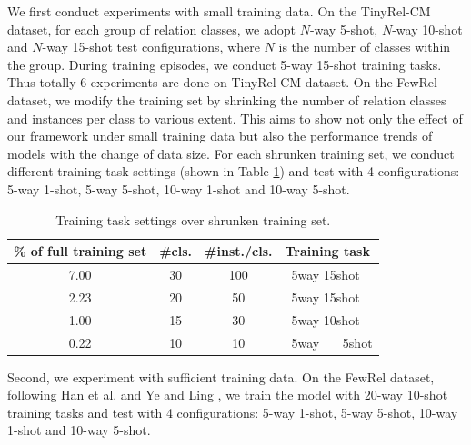 We first conduct experiments with small training data.
On the TinyRel-CM dataset, for each group of relation classes, we adopt $N$-way 5-shot, $N$-way 10-shot and $N$-way 15-shot test configurations, where $N$ is the number of classes within the group. During training episodes, we conduct 5-way 15-shot training tasks. Thus totally 6 experiments are done on TinyRel-CM dataset.
On the FewRel dataset, we modify the training set by shrinking the number of relation classes and instances per class to various extent. This aims to show not only the effect of our framework under small training data but also the performance trends of models with the change of data size.
For each shrunken training set, we conduct different training task settings
(shown in Table \ref{trainingsetting}) and test with 4 configurations:
5-way 1-shot, 5-way 5-shot, 10-way 1-shot and 10-way 5-shot. %

\begin{table}[ht]
\centering
\small
\caption{Training task settings over shrunken training set.}
\label{trainingsetting}
\begin{tabular}{|c|c|c|l|}
\hline
\textbf{\% of full training set} & \textbf{\#cls.} & \textbf{\#inst./cls.} & \textbf{Training task} \\ \hline
7.00 & 30 & 100 & ~5\text{-}way 15\text{-}shot  \\ \hline
2.23 & 20 & 50 & ~5\text{-}way 15\text{-}shot \\ \hline
1.00 & 15 & 30 & ~5\text{-}way 10\text{-}shot \\ \hline
0.22 & 10 & 10 & ~5\text{-}way ~~~5\text{-}shot \\ \hline
\end{tabular}
\end{table}

Second, we experiment with sufficient training data.
On the FewRel dataset, following Han et al.  and Ye and Ling , we train the model with 20-way 10-shot training tasks and test with 4 configurations: 5-way 1-shot, 5-way 5-shot, 10-way 1-shot and 10-way 5-shot.

